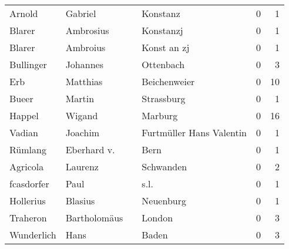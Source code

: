 \begin{center}
\begin{tiny}
\begin{longtabu}{llllrr}
                   Arnold &                            Gabriel &             &                                    Konstanz &          0 &         1 \\
                   Blarer &                          Ambrosius &             &                                   Konstanzj &          0 &         1 \\
                   Blarer &                           Ambroius &             &                                 Konst an zj &          0 &         1 \\
                Bullinger &                           Johannes &             &                                   Ottenbach &          0 &         3 \\
                      Erb &                           Matthias &             &                                Beichenweier &          0 &        10 \\
                    Bueer &                             Martin &             &                                  Strassburg &          0 &         1 \\
                   Happel &                             Wigand &             &                                     Marburg &          0 &        16 \\
                   Vadian &                            Joachim &             &                    Furtmüller Hans Valentin &          0 &         1 \\
                  Rümlang &                        Eberhard v. &             &                                        Bern &          0 &         1 \\
                 Agricola &                            Laurenz &             &                                   Schwanden &          0 &         2 \\
               fcasdorfer &                               Paul &             &                                        s.l. &          0 &         1 \\
                Hollerius &                            Blasius &             &                                   Neuenburg &          0 &         1 \\
                 Traheron &                       Bartholomäus &             &                                      London &          0 &         3 \\
               Wunderlich &                               Hans &             &                                       Baden &          0 &         3 \\

\end{longtabu}
\end{tiny}
\end{center}
